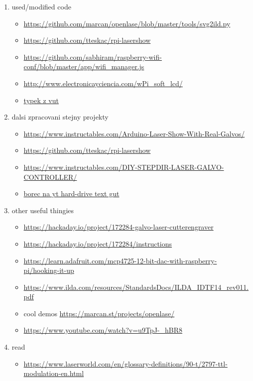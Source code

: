 \documentclass{template/socthesis}
\begin{document}
\begin{enumerate}
  \item used/modified code
        \begin{itemize}
          \item \url{https://github.com/marcan/openlase/blob/master/tools/svg2ild.py}
          \item \url{https://github.com/tteskac/rpi-lasershow}
          \item \url{https://github.com/sabhiram/raspberry-wifi-conf/blob/master/app/wifi_manager.js}
          \item \url{http://www.electronicayciencia.com/wPi_soft_lcd/}
          \item \href{https://dspace.vutbr.cz/bitstream/handle/11012/38621/final-thesis.pdf?sequence=-1}{typek z vut}
        \end{itemize}
  \item dalsi zpracovani stejny projekty
        \begin{itemize}
          \item \url{https://www.instructables.com/Arduino-Laser-Show-With-Real-Galvos/}
          \item \url{https://github.com/tteskac/rpi-lasershow}
          \item \url{https://www.instructables.com/DIY-STEPDIR-LASER-GALVO-CONTROLLER/}
          \item \href{https://youtu.be/u9TpJ-_hBR8?si=mHy-UrptZZJ0Xu5-}{borec na yt hard-drive text gut}
        \end{itemize}
  \item other useful thingies
        \begin{itemize}
          \item \url{https://hackaday.io/project/172284-galvo-laser-cutterengraver}

          \item \url{https://hackaday.io/project/172284/instructions}

          \item \url{https://learn.adafruit.com/mcp4725-12-bit-dac-with-raspberry-pi/hooking-it-up}
          \item \url{https://www.ilda.com/resources/StandardsDocs/ILDA_IDTF14_rev011.pdf}
          \item cool demos \url{https://marcan.st/projects/openlase/}
          \item \url{https://www.youtube.com/watch?v=u9TpJ-_hBR8}
        \end{itemize}
  \item read
        \begin{itemize}
          \item \url{https://www.laserworld.com/en/glossary-definitions/90-t/2797-ttl-modulation-en.html}
        \end{itemize}

\end{enumerate}
\end{document}
